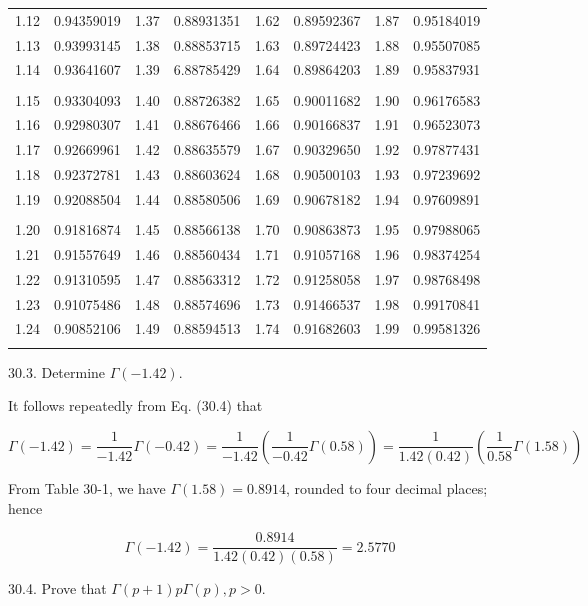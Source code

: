 \documentclass[10pt]{article}
\begin{document}
\begin{center}
\begin{tabular}{|c|c|c|c|c|c|c|c|}
1.12 & 0.94359019 & 1.37 & 0.88931351 & 1.62 & 0.89592367 & 1.87 & 0.95184019 \\
1.13 & 0.93993145 & 1.38 & 0.88853715 & 1.63 & 0.89724423 & 1.88 & 0.95507085 \\
1.14 & 0.93641607 & 1.39 & 6.88785429 & 1.64 & 0.89864203 & 1.89 & 0.95837931 \\
 &  &  &  &  &  &  &  \\
1.15 & 0.93304093 & 1.40 & 0.88726382 & 1.65 & 0.90011682 & 1.90 & 0.96176583 \\
1.16 & 0.92980307 & 1.41 & 0.88676466 & 1.66 & 0.90166837 & 1.91 & 0.96523073 \\
1.17 & 0.92669961 & 1.42 & 0.88635579 & 1.67 & 0.90329650 & 1.92 & 0.97877431 \\
1.18 & 0.92372781 & 1.43 & 0.88603624 & 1.68 & 0.90500103 & 1.93 & 0.97239692 \\
1.19 & 0.92088504 & 1.44 & 0.88580506 & 1.69 & 0.90678182 & 1.94 & 0.97609891 \\
 &  &  &  &  &  &  &  \\
1.20 & 0.91816874 & 1.45 & 0.88566138 & 1.70 & 0.90863873 & 1.95 & 0.97988065 \\
1.21 & 0.91557649 & 1.46 & 0.88560434 & 1.71 & 0.91057168 & 1.96 & 0.98374254 \\
1.22 & 0.91310595 & 1.47 & 0.88563312 & 1.72 & 0.91258058 & 1.97 & 0.98768498 \\
1.23 & 0.91075486 & 1.48 & 0.88574696 & 1.73 & 0.91466537 & 1.98 & 0.99170841 \\
1.24 & 0.90852106 & 1.49 & 0.88594513 & 1.74 & 0.91682603 & 1.99 & 0.99581326 \\
 &  &  &  &  &  &  &  \\
\end{tabular}
\end{center}

30.3. Determine $\Gamma(-1.42)$.

It follows repeatedly from Eq. (30.4) that

$$
\Gamma(-1.42)=\frac{1}{-1.42} \Gamma(-0.42)=\frac{1}{-1.42}\left(\frac{1}{-0.42} \Gamma(0.58)\right)=\frac{1}{1.42(0.42)}\left(\frac{1}{0.58} \Gamma(1.58)\right)
$$

From Table 30-1, we have $\Gamma(1.58)=0.8914$, rounded to four decimal places; hence

$$
\Gamma(-1.42)=\frac{0.8914}{1.42(0.42)(0.58)}=2.5770
$$

30.4. Prove that $\Gamma(p+1) p \Gamma(p), p>0$.
\end{document}
